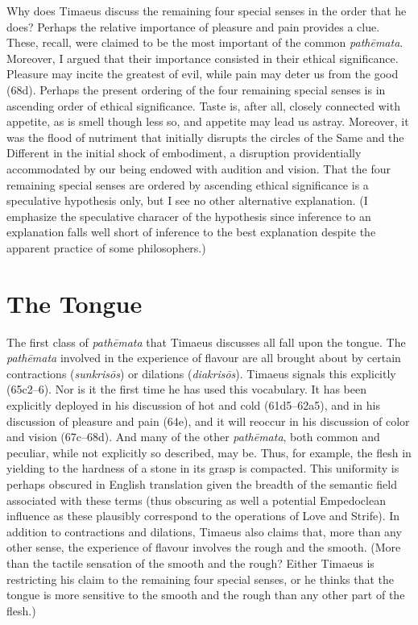 Why does Timaeus discuss the remaining four special senses in the order that he does? Perhaps the relative importance of pleasure and pain provides a clue. These, recall, were claimed to be the most important of the common \emph{pathēmata}. Moreover, I argued that their importance consisted in their ethical significance. Pleasure may incite the greatest of evil, while pain may deter us from the good (68d). Perhaps the present ordering of the four remaining special senses is in ascending order of ethical significance. Taste is, after all, closely connected with appetite, as is smell though less so, and appetite may lead us astray. Moreover, it was the flood of nutriment that initially disrupts the circles of the Same and the Different in the initial shock of embodiment, a disruption providentially accommodated by our being endowed with audition and vision. That the four remaining special senses are ordered by ascending ethical significance is a speculative hypothesis only, but I see no other alternative explanation. (I emphasize the speculative characer of the hypothesis since inference to an explanation falls well short of inference to the best explanation despite the apparent practice of some philosophers.)


\section{The Tongue} %
\label{sec:the_tongue}

The first class of \emph{pathēmata} that Timaeus discusses all fall upon the tongue. The \emph{pathēmata} involved in the experience of flavour are all brought about by certain contractions (\emph{sunkrisōs}) or dilations (\emph{diakrisōs}). Timaeus signals this explicitly (65c2--6). Nor is it the first time he has used this vocabulary. It has been explicitly deployed in his discussion of hot and cold (61d5–62a5), and in his discussion of pleasure and pain (64e), and it will reoccur in his discussion of color and vision (67c–68d). And many of the other \emph{pathēmata}, both common and peculiar, while not explicitly so described, may be. Thus, for example, the flesh in yielding to the hardness of a stone in its grasp is compacted. This uniformity is perhaps obscured in English translation given the breadth of the semantic field associated with these terms (thus obscuring as well a potential Empedoclean influence as these plausibly correspond to the operations of Love and Strife). In addition to contractions and dilations, Timaeus also claims that, more than any other sense, the experience of flavour involves the rough and the smooth. (More than the tactile sensation of the smooth and the rough? Either Timaeus is restricting his claim to the remaining four special senses, or he thinks that the tongue is more sensitive to the smooth and the rough than any other part of the flesh.)

